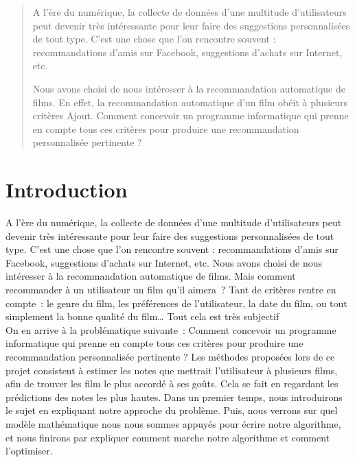 \documentclass[a4paper,10pt]{article}
\title{}
\author{}
\begin{document}
\maketitle

\begin{abstract}
A l’ère du numérique, la collecte de données d’une multitude d’utilisateurs peut devenir très intéressante pour leur faire des suggestions personnalisées de tout type. C’est une chose que l'on rencontre souvent : recommandations d’amis sur Facebook, suggestions d’achats sur Internet, etc.

Nous avons choisi de nous intéresser à la recommandation automatique de films. En effet, la recommandation automatique d’un film obéit à plusieurs critères Ajout. Comment concevoir un programme informatique qui prenne en compte tous ces critères pour produire une recommandation personnalisée pertinente ?

\end{abstract}

\section*{Introduction}
A l’ère du numérique, la collecte de données d’une multitude d’utilisateurs peut devenir très intéressante pour leur faire des suggestions 
personnalisées de tout type. C’est une chose que l’on rencontre souvent : recommandations d’amis sur Facebook, suggestions d’achats sur Internet, etc.
Nous avons choisi de nous intéresser à la recommandation automatique de films.
Mais comment recommander à un utilisateur un film qu’il aimera ? Tant de critères rentre en compte : 
le genre du film, les préférences de l’utilisateur, la date du film, ou tout simplement la bonne qualité du film… Tout cela est très subjectif \! \\


On en arrive à la problématique suivante : Comment concevoir un programme informatique 
qui prenne en compte tous ces critères pour produire une recommandation personnalisée pertinente ?
Les méthodes proposées lors de ce projet consistent à estimer les notes que mettrait l’utilisateur à plusieurs films,
afin de trouver les film le plus accordé à ses goûts. Cela se fait en regardant les prédictions des notes les plus hautes. 
Dans un premier temps, nous introduirons le sujet en expliquant notre approche du problème.
Puis, nous verrons sur quel modèle mathématique nous nous sommes appuyés pour écrire notre algorithme, et nous finirons par expliquer comment marche notre algorithme et comment l’optimiser. \\
\end{document}
